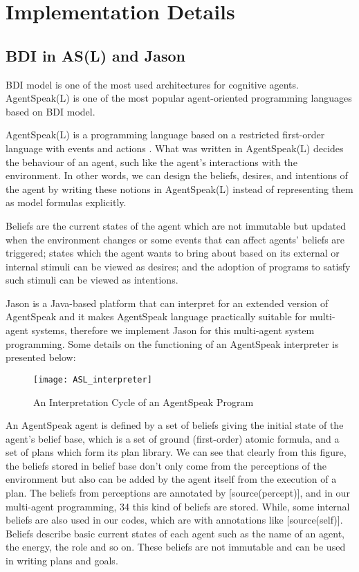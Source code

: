 \section{Implementation Details}
\subsection{BDI in AS(L) and Jason}

BDI model is one of the most used architectures for cognitive agents. AgentSpeak(L) is one of the most popular agent-oriented programming languages based on BDI model.

AgentSpeak(L) is a programming language based on a restricted first-order language with events and actions \cite{anand_AgentSpeak_1996}. What was written in AgentSpeak(L) decides the behaviour of an agent, such like the agent's interactions with the environment. In other words, we can design the beliefs, desires, and intentions of the agent by writing these notions in AgentSpeak(L) instead of representing them as model formulas explicitly.

Beliefs are the current states of the agent which are not immutable but updated when the environment changes or some events that can affect agents' beliefs are triggered; states which the agent wants to bring about based on its external or internal stimuli can be viewed as desires; and the adoption of programs to satisfy such stimuli can be viewed as intentions\cite{anand_AgentSpeak_1996}. 

Jason is a Java-based platform that can interpret for an extended version of AgentSpeak and it makes AgentSpeak language practically suitable for multi-agent systems, therefore we implement Jason for this multi-agent system programming. Some details on the functioning of an AgentSpeak interpreter is presented below:

\begin{figure}[H]
\centering
\begin{minipage}[!htbp]{\linewidth}
\texttt{[image: ASL\_interpreter]}
\caption{An Interpretation Cycle of an AgentSpeak Program\cite{rafael_BDIAgent_2005}}
\label{fig:ASL_interpreter}
\end{minipage}
\end{figure}


An AgentSpeak agent is defined by a set of beliefs giving the initial state of the agent’s belief base, which is a set of ground (first-order) atomic formula, and a set of plans which form its plan library\cite{rafael_BDIAgent_2005}. We can see that clearly from this figure, the beliefs stored in belief base don't only come from the perceptions of the environment but also can be added by the agent itself from the execution of a plan. The beliefs from perceptions are annotated by [source(percept)], and in our multi-agent programming, 34 this kind of beliefs are stored. While, some internal beliefs are also used in our codes, which are with annotations like [source(self)]. Beliefs describe basic current states of each agent such as the name of an agent, the energy, the role and so on.  These beliefs are not immutable and can be used in writing plans and goals. 

